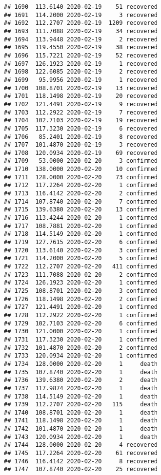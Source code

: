 \documentclass[
]{article}
\begin{document}
\begin{verbatim}
## 1690  113.6140 2020-02-19    51 recovered
## 1691  114.2000 2020-02-19     3 recovered
## 1692  112.2707 2020-02-19  1209 recovered
## 1693  111.7088 2020-02-19    34 recovered
## 1694  113.9448 2020-02-19     2 recovered
## 1695  119.4550 2020-02-19    38 recovered
## 1696  115.7221 2020-02-19    52 recovered
## 1697  126.1923 2020-02-19     1 recovered
## 1698  122.6085 2020-02-19     2 recovered
## 1699   95.9956 2020-02-19     1 recovered
## 1700  108.8701 2020-02-19    13 recovered
## 1701  118.1498 2020-02-19    20 recovered
## 1702  121.4491 2020-02-19     9 recovered
## 1703  112.2922 2020-02-19     7 recovered
## 1704  102.7103 2020-02-19    19 recovered
## 1705  117.3230 2020-02-19     6 recovered
## 1706   85.2401 2020-02-19     8 recovered
## 1707  101.4870 2020-02-19     3 recovered
## 1708  120.0934 2020-02-19    69 recovered
## 1709   53.0000 2020-02-20     3 confirmed
## 1710  138.0000 2020-02-20    10 confirmed
## 1711  128.0000 2020-02-20    73 confirmed
## 1712  117.2264 2020-02-20     1 confirmed
## 1713  116.4142 2020-02-20     2 confirmed
## 1714  107.8740 2020-02-20     7 confirmed
## 1715  139.6380 2020-02-20    13 confirmed
## 1716  113.4244 2020-02-20     1 confirmed
## 1717  108.7881 2020-02-20     1 confirmed
## 1718  114.5149 2020-02-20     1 confirmed
## 1719  127.7615 2020-02-20     6 confirmed
## 1720  113.6140 2020-02-20     3 confirmed
## 1721  114.2000 2020-02-20     5 confirmed
## 1722  112.2707 2020-02-20   411 confirmed
## 1723  111.7088 2020-02-20     2 confirmed
## 1724  126.1923 2020-02-20     1 confirmed
## 1725  108.8701 2020-02-20     3 confirmed
## 1726  118.1498 2020-02-20     2 confirmed
## 1727  121.4491 2020-02-20     1 confirmed
## 1728  112.2922 2020-02-20     1 confirmed
## 1729  102.7103 2020-02-20     6 confirmed
## 1730  121.0000 2020-02-20     1 confirmed
## 1731  117.3230 2020-02-20     1 confirmed
## 1732  101.4870 2020-02-20     2 confirmed
## 1733  120.0934 2020-02-20     1 confirmed
## 1734  128.0000 2020-02-20     1     death
## 1735  107.8740 2020-02-20     1     death
## 1736  139.6380 2020-02-20     2     death
## 1737  117.9874 2020-02-20     1     death
## 1738  114.5149 2020-02-20     1     death
## 1739  112.2707 2020-02-20   115     death
## 1740  108.8701 2020-02-20     1     death
## 1741  118.1498 2020-02-20     1     death
## 1742  101.4870 2020-02-20     1     death
## 1743  120.0934 2020-02-20     1     death
## 1744  128.0000 2020-02-20     4 recovered
## 1745  117.2264 2020-02-20    61 recovered
## 1746  116.4142 2020-02-20     8 recovered
## 1747  107.8740 2020-02-20    25 recovered

\end{verbatim}
\end{document}
